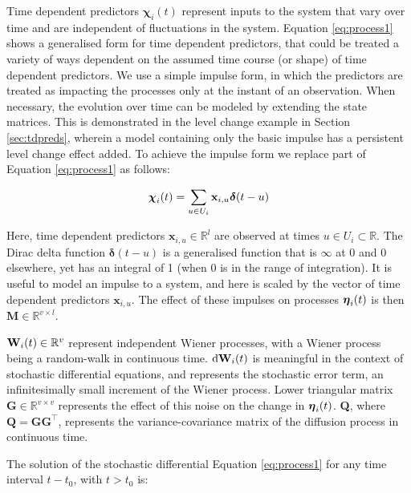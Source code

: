 \documentclass[nojss]{jss}\usepackage[]{graphicx}\usepackage[]{color}
\begin{document}
Time dependent predictors $\boldsymbol{\chi}_i(t)$ represent inputs to the system that vary over time and are independent of fluctuations in the system. Equation \ref{eq:process1} shows a generalised form for time dependent predictors, that could be treated a variety of ways dependent on the assumed time course (or shape) of time dependent predictors. We use a simple impulse form, in which the predictors are treated as impacting the processes only at the instant of an observation. When necessary, the evolution over time can be modeled by extending the state matrices. This is demonstrated in the level change example in Section \ref{sec:tdpreds}, wherein a model containing only the basic impulse has a persistent level change effect added. To achieve the impulse form we replace part of Equation \ref{eq:process1} as follows:

\begin{equation}
\label{eq:spike}
\mathrm{\boldsymbol{\chi}_\mathnormal{i} ( \mathnormal{t} ) =\sum_{\mathnormal{u} \in \mathnormal{U_i}}  \mathbf{x}_{\mathnormal{i,u}} \boldsymbol{\delta} ( \mathnormal{t-u} )     }
\end{equation}

Here, time dependent predictors $\mathbf{x}_{i,u} \in \mathbb{R}^{l}$ are observed at times $u \in U_i \subset \mathbb{R}$. The Dirac delta function $\boldsymbol{\delta}(t-u)$ is a generalised function that is $\infty$ at 0 and 0 elsewhere, yet has an integral of 1 (when 0 is in the range of integration). It is useful to model an impulse to a system, and here is scaled by the vector of time dependent predictors $\mathbf{x}_{i,u}$.  The effect of these impulses on processes $\boldsymbol{\eta}_\mathnormal{i}(\mathnormal{t})$ is then $\textbf{M}\in \mathbb{R}^{v \times l}$.

$\textbf{W}_\mathnormal{i}(\mathnormal{t}) \in \mathbb{R}^{v}$ represent independent Wiener processes, with a Wiener process being a random-walk in continuous time. $\textnormal{d}\textbf{W}_\mathnormal{i}(\mathnormal{t})$ is meaningful in the context of stochastic differential equations, and represents the stochastic error term, an infinitesimally
small increment of the Wiener process. Lower triangular matrix $\mathbf{G}\in \mathbb{R}^{v \times v}$ represents the effect of this noise on the change in $\boldsymbol{\eta}_\mathnormal{i}(\mathnormal{t})$.  \textbf{Q}, where $\textbf{Q} = \textbf{GG}^\top $, represents the variance-covariance matrix of the diffusion process in continuous time.

The solution of the stochastic differential Equation \ref{eq:process1} for any time interval $t-t_0$, with $t > t_0$ is:
\end{document}
